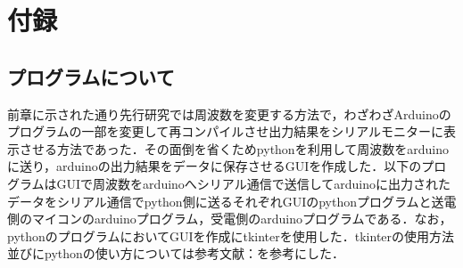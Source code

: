 \documentclass[12pt]{jarticle}
\begin{document}
\section{付録}
\subsection{プログラムについて}
前章に示された通り先行研究では周波数を変更する方法で，わざわざArduinoのプログラムの一部を変更して再コンパイルさせ出力結果をシリアルモニターに表示させる方法であった．その面倒を省くためpythonを利用して周波数をarduinoに送り，arduinoの出力結果をデータに保存させるGUIを作成した．以下のプログラムはGUIで周波数をarduinoへシリアル通信で送信してarduinoに出力されたデータをシリアル通信でpython側に送るそれぞれGUIのpythonプログラムと送電側のマイコンのarduinoプログラム，受電側のarduinoプログラムである．なお，pythonのプログラムにおいてGUIを作成にtkinterを使用した．tkinterの使用方法並びにpythonの使い方については参考文献：\cite{tkinter}を参考にした．
\end{document}
